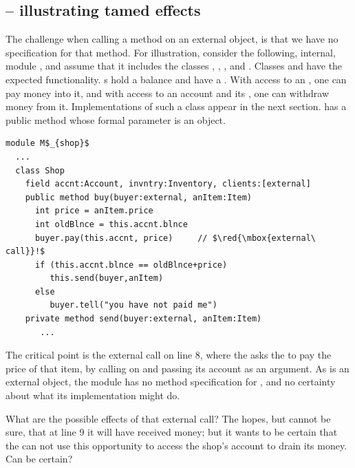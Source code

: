  

\subsection*{ -- illustrating tamed effects} %
\label{sec:how}
\label{sec:shop}

The challenge when calling a method on an external object, is that we have no specification for that method. 
 For illustration, consider the following, internal, module \Mshop, and assume that it includes the classes , , , and . 
Classes  { and  have the expected functionality. 
s hold a balance and have a \password. 
With access to an , %
one  can pay money into it, 
and with access to an account  and its \password, one can withdraw money from it.
Implementations of such a class  appear in the next section.
}
   has  a public method  whose formal parameter  is an    object. 

\begin{lstlisting}[mathescape=true, language=Chainmail, frame=lines]
module M$_{shop}$
  ...   
  class Shop
    field accnt:Account, invntry:Inventory, clients:[external]      
    public method buy(buyer:external, anItem:Item)
      int price = anItem.price
      int oldBlnce = this.accnt.blnce
      buyer.pay(this.accnt, price)     // $\red{\mbox{external\ call}}!$
      if (this.accnt.blnce == oldBlnce+price)  
         this.send(buyer,anItem)
      else
         buyer.tell("you have not paid me")      
    private method send(buyer:external, anItem:Item)  
       ...         
\end{lstlisting}
 

The critical point is the external call on line 8,   {where the  asks the  to pay the price of that item,
by calling   on  and passing its account as an argument.
As  is an external object, the module \Mshop has no method specification for , and no 
certainty about what its implementation %
might do. 
}

{What are the possible effects of that external call?}
{The  hopes, but cannot be sure, that at line 9  it  will have received money; but 
it wants to be certain  that the  can not use this opportunity to access the 
shop's account to drain its money.
Can   be certain?}

